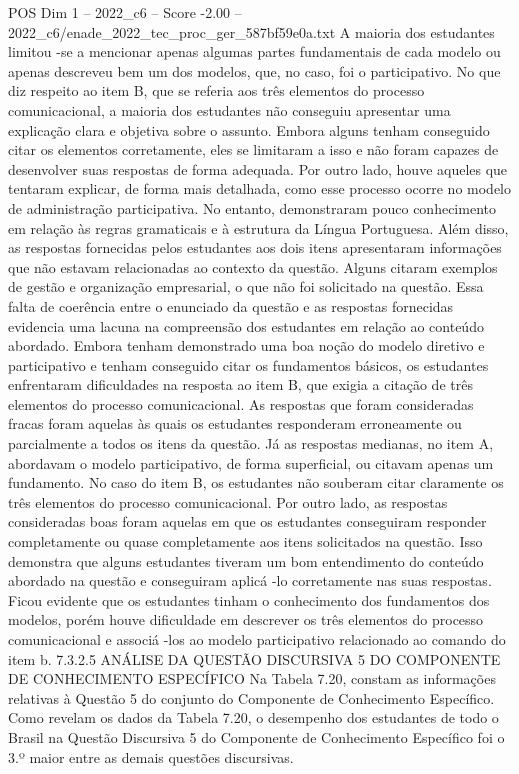 \begin{textsample}{POS Dim 1 – 2022\_c6 – Score -2.00 – 2022\_c6/enade\_2022\_tec\_proc\_ger\_587bf59e0a.txt}
A maioria dos estudantes limitou -se a mencionar apenas algumas partes fundamentais de cada modelo ou apenas descreveu bem um dos modelos, que, no caso, foi o participativo.
No que diz respeito ao item B, que se referia aos três elementos do processo comunicacional, a maioria dos estudantes não conseguiu apresentar uma explicação clara e objetiva sobre o assunto.
Embora alguns tenham conseguido citar os elementos corretamente, eles se limitaram a isso e não foram capazes de desenvolver suas respostas de forma adequada.
Por outro lado, houve aqueles que tentaram explicar, de forma mais detalhada, como esse processo ocorre no modelo de administração participativa.
No entanto, demonstraram pouco conhecimento em relação às regras gramaticais e à estrutura da Língua Portuguesa.
Além disso, as respostas fornecidas pelos estudantes aos dois itens apresentaram informações que não estavam relacionadas ao contexto da questão.
Alguns citaram exemplos de gestão e organização empresarial, o que não foi solicitado na questão.
Essa falta de coerência entre o enunciado da questão e as respostas fornecidas evidencia uma lacuna na compreensão dos estudantes em relação ao conteúdo abordado.
Embora tenham demonstrado uma boa noção do modelo diretivo e participativo e tenham conseguido citar os fundamentos básicos, os estudantes enfrentaram dificuldades na resposta ao item B, que exigia a citação de três elementos do processo comunicacional.
As respostas que foram consideradas fracas foram aquelas às quais os estudantes responderam erroneamente ou parcialmente a todos os itens da questão.
Já as respostas medianas, no item A, abordavam o modelo participativo, de forma superficial, ou citavam apenas um fundamento.
No caso do item B, os estudantes não souberam citar claramente os três elementos do processo comunicacional.
Por outro lado, as respostas consideradas boas foram aquelas em que os estudantes conseguiram responder completamente ou quase completamente aos itens solicitados na questão.
Isso demonstra que alguns estudantes tiveram um bom entendimento do conteúdo abordado na questão e conseguiram aplicá -lo corretamente nas suas respostas.
Ficou evidente que os estudantes tinham o conhecimento dos fundamentos dos modelos, porém houve dificuldade em descrever os três elementos do processo comunicacional e associá -los ao modelo participativo relacionado ao comando do item b. 7.3.2.5 ANÁLISE DA QUESTÃO DISCURSIVA 5 DO COMPONENTE DE CONHECIMENTO ESPECÍFICO Na Tabela 7.20, constam as informações relativas à Questão 5 do conjunto do Componente de Conhecimento Específico.
Como revelam os dados da Tabela 7.20, o desempenho dos estudantes de todo o Brasil na Questão Discursiva 5 do Componente de Conhecimento Específico foi o 3.º maior entre as demais questões discursivas.

\end{textsample}
